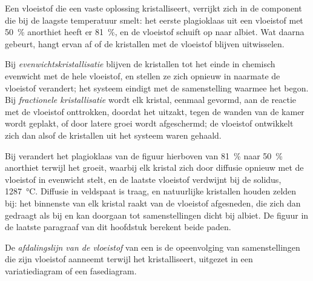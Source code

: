 Een vloeistof die een vaste oplossing kristalliseert, verrijkt zich in de component die
bij de laagste temperatuur smelt: het eerste plagioklaas uit een vloeistof met
\qty{50}{\percent} anorthiet heeft er \qty{81}{\percent}, en de vloeistof schuift op naar
albiet. Wat daarna gebeurt, hangt ervan af of de kristallen met de vloeistof blijven
uitwisselen.

\begin{definition}
\label{def:b2:magmatic-differentiation:crystallisation}
Bij \emph{evenwichtskristallisatie} blijven de
kristallen tot het einde in chemisch evenwicht met de hele vloeistof, en stellen ze
zich opnieuw in naarmate de vloeistof verandert; het systeem eindigt met de samenstelling
waarmee het begon. Bij \emph{fractionele kristallisatie}
wordt elk kristal, eenmaal gevormd, aan de reactie met de
vloeistof onttrokken, doordat het uitzakt, tegen de wanden van de kamer wordt geplakt, of
door latere groei wordt afgeschermd; de vloeistof ontwikkelt zich dan alsof de kristallen
uit het systeem waren gehaald.
\end{definition}

Bij  verandert het plagioklaas van de figuur hierboven van
\qty{81}{\percent} naar \qty{50}{\percent} anorthiet terwijl het groeit, waarbij elk kristal
zich door diffusie opnieuw met de vloeistof in evenwicht stelt, en de laatste vloeistof verdwijnt bij
de solidus, \qty{1287}{\celsius}. Diffusie in veldspaat is traag, en natuurlijke
kristallen houden zelden bij: het binnenste van elk kristal raakt van de vloeistof afgesneden,
die zich dan gedraagt als bij  en kan doorgaan tot samenstellingen
dicht bij albiet. De figuur in de laatste paragraaf van dit hoofdstuk berekent beide paden.

\begin{definition}\label{def:b2:magmatic-differentiation:lld}
De \emph{afdalingslijn van de vloeistof} van een  is de
opeenvolging van samenstellingen die zijn vloeistof aanneemt terwijl het kristalliseert, uitgezet in een
variatiediagram of een fasediagram.
\end{definition}

